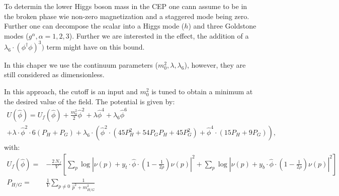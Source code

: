 To determin the lower Higgs boson mass in the CEP one cann assume to be in the broken phase wie non-zero
magnetization and a staggered mode being zero. Further one can decompose the scalar into a Higgs mode ($h$) and three 
Goldstone modes ($g^{\alpha}, \alpha=1,2,3$). Further we are interested in the effect, the addition of a $\lambda_6 \cdot (\phi^{\dagger}\phi)^3)$ term
might have on this bound.

In this chaper we use the continuum parameters ($m_0^2, \lambda, \lambda_6$), however, they are still considered as dimensionless.

In this approach, the cutoff is an input and $m_0^2$ is tuned to obtain a minimum at the desired value of the field. The potential is given by:
\begin{multline}\label{eq:CEP_lowerBound_with_phi_6}
 U(\hat \phi) = U_f(\hat \phi) + \frac{m_0^2}{2} {\hat \phi}^2 +\lambda {\hat \phi}^4 + \lambda_6 {\hat \phi}^6 \\
                         + \lambda \cdot {\hat \phi}^2 \cdot 6(P_H+P_G)
                         + \lambda_6 \cdot \left( {\hat \phi}^2 \cdot ( 45 P_H^2 + 54 P_G P_H + 45 P_G^2)
                         + {\hat \phi}^4 \cdot ( 15 P_H + 9 P_G ) \right ),
\end{multline}
with:
\begin{align}
 \label{eq:fermionic_contribution_CEP_massbound}
 U_f(\hat \phi) =& -\frac{2\, N_f}{V} \left[
                 \sum\limits_p \log\left| \nu(p) + y_t \cdot \hat \phi \cdot \left( 1-\frac{1}{2 \rho} \right) \nu(p) \right|^2 +
                 \sum\limits_p \log\left| \nu(p) + y_b \cdot \hat \phi \cdot \left( 1-\frac{1}{2 \rho} \right) \nu(p) \right|^2 \right] \\
 \label{eq:def_propagator_sums}
 P_{H/G} =& \frac{1}{V} \sum\limits_{p \neq 0} \frac{1}{{\hat p}^2 + m_{H/G}^2}
\end{align}

